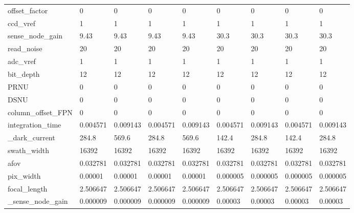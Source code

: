 \begin{table}
\begin{tabular}{lllllllll}
offset\_factor          &         0 &         0 &         0 &         0 &         0 &         0 &         0 &         0 \\
ccd\_vref               &         1 &         1 &         1 &         1 &         1 &         1 &         1 &         1 \\
sense\_node\_gain        &      9.43 &      9.43 &      9.43 &      9.43 &      30.3 &      30.3 &      30.3 &      30.3 \\
read\_noise             &        20 &        20 &        20 &        20 &        20 &        20 &        20 &        20 \\
adc\_vref               &         1 &         1 &         1 &         1 &         1 &         1 &         1 &         1 \\
bit\_depth              &        12 &        12 &        12 &        12 &        12 &        12 &        12 &        12 \\
PRNU                   &         0 &         0 &         0 &         0 &         0 &         0 &         0 &         0 \\
DSNU                   &         0 &         0 &         0 &         0 &         0 &         0 &         0 &         0 \\
column\_offset\_FPN      &         0 &         0 &         0 &         0 &         0 &         0 &         0 &         0 \\
integration\_time       &  0.004571 &  0.009143 &  0.004571 &  0.009143 &  0.004571 &  0.009143 &  0.004571 &  0.009143 \\
\_dark\_current          &     284.8 &     569.6 &     284.8 &     569.6 &     142.4 &     284.8 &     142.4 &     284.8 \\
swath\_width            &     16392 &     16392 &     16392 &     16392 &     16392 &     16392 &     16392 &     16392 \\
afov                   &  0.032781 &  0.032781 &  0.032781 &  0.032781 &  0.032781 &  0.032781 &  0.032781 &  0.032781 \\
pix\_width              &   0.00001 &   0.00001 &   0.00001 &   0.00001 &  0.000005 &  0.000005 &  0.000005 &  0.000005 \\
focal\_length           &  2.506647 &  2.506647 &  2.506647 &  2.506647 &  2.506647 &  2.506647 &  2.506647 &  2.506647 \\
\_sense\_node\_gain       &  0.000009 &  0.000009 &  0.000009 &  0.000009 &   0.00003 &   0.00003 &   0.00003 &   0.00003 \\
\bottomrule
\end{tabular}
\end{table}
